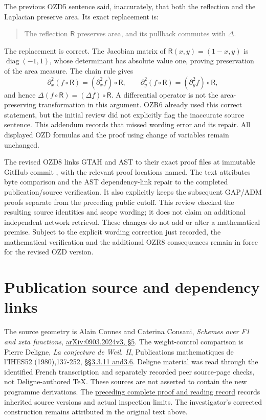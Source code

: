 The previous OZD5 sentence said, inaccurately, that both the reflection
and the Laplacian preserve area. Its exact replacement is:

\begin{quote}
The reflection \(\mathsf R\) preserves area, and its pullback commutes
with \(\Delta\).
\end{quote}

The replacement is correct. The Jacobian matrix of
\(\mathsf R(x,y)=(1-x,y)\) is \(\operatorname{diag}(-1,1)\), whose
determinant has absolute value one, proving preservation of the area
measure. The chain rule gives \[
\partial_x^2(f\circ\mathsf R)=(\partial_x^2f)\circ\mathsf R,
\qquad
\partial_y^2(f\circ\mathsf R)=(\partial_y^2f)\circ\mathsf R,
\] and hence \(\Delta(f\circ\mathsf R)=(\Delta f)\circ\mathsf R\). A
differential operator is not the area-preserving transformation in this
argument. OZR6 already used this correct statement, but the initial
review did not explicitly flag the inaccurate source sentence. This
addendum records that missed wording error and its repair. All displayed
OZD formulas and the proof using change of variables remain unchanged.

The revised OZD8 links GTAH and AST to their exact proof files at
immutable GitHub commit
, with the relevant
proof locations named. The text attributes byte comparison and the AST
dependency-link repair to the completed publication/source verification.
It also explicitly keeps the subsequent GAP/ADM proofs separate from the
preceding public cutoff. This review checked the resulting source
identities and scope wording; it does not claim an additional
independent network retrieval. These changes do not add or alter a
mathematical premise. Subject to the explicit wording correction just
recorded, the mathematical verification and the additional OZR8
consequences remain in force for the revised OZD version.

\section{Publication source and dependency
links}\label{publication-source-and-dependency-links-6}

The source geometry is Alain Connes and Caterina Consani, \emph{Schemes
over F1 and zeta functions},
\href{https://arxiv.org/abs/0903.2024v3}{arXiv:0903.2024v3, §5}. The
weight-control comparison is Pierre Deligne, \emph{La conjecture de
Weil. II}, Publications mathematiques de l'IHES52 (1980),137-252,
\href{https://www.numdam.org/item/PMIHES_1980__52__137_0/}{§§3.3.11
and3.6}. Deligne material was read through the identified French
transcription and separately recorded peer source-page checks, not
Deligne-authored TeX. These sources are not asserted to contain the new
programme derivations. The
\href{https://github.com/KokunoYumeto/zeta-function-research-reader/blob/36a82ecca98addb8a98b48204e349737856c7223/workbenches/splitzero-tandem/continuations/20260924-cohomology-weight-and-character-lifts/BUILD_AND_REVIEW.md}{preceding
complete proof and reading record} records inherited source versions and
actual inspection limits. The investigator's corrected construction
remains attributed in the original text above.

